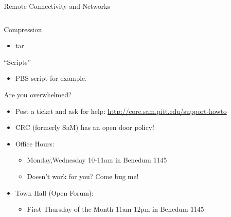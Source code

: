 \documentclass[hyperref={pdfpagelabels=false},12pt]{beamer}
\begin{document}
\begin{frame}{Remote Connectivity and Networks}
\inputminted[bgcolor=lightgray,linenos,fontsize=\footnotesize]{bash}{code/ssh-config-1.txt}
\end{frame}

\begin{frame}{Compression}
    \begin{itemize}
        \item tar
    \end{itemize}
\end{frame}

\begin{frame}{``Scripts''}
    \begin{itemize}
        \item PBS script for example. 
    \end{itemize}
\end{frame}

\begin{frame}{Are you overwhelmed?}
    \begin{itemize}
        \item Post a ticket and ask for help: \url{http://core.sam.pitt.edu/support-howto}
        \item CRC (formerly SaM) has an open door policy!
        \item Office Hours:
        \begin{itemize}
            \item Monday,Wednesday 10-11am in Benedum 1145 
            \item Doesn't work for you? Come bug me!
        \end{itemize}
        \item Town Hall (Open Forum):
        \begin{itemize}
            \item First Thursday of the Month 11am-12pm in Benedum 1145
        \end{itemize}
    \end{itemize}
\end{frame}
\end{document}
